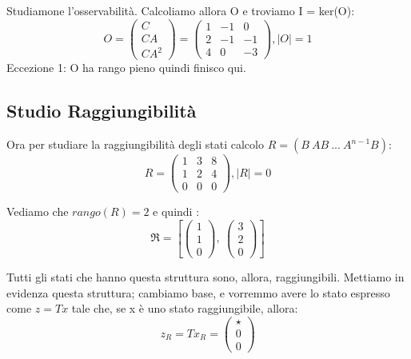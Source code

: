 \documentclass{article}
\begin{document}
Studiamone l’osservabilità. Calcoliamo allora O e troviamo I = ker(O):
\[
 O = \begin{pmatrix}C \\ CA \\ CA^2 \end{pmatrix} = \left(\begin{matrix}1 & -1 & 0\\2 & -1 & -1\\4 & 0 & -3\end{matrix}\right), |O| = 1 \]
Eccezione 1: O ha rango pieno quindi finisco qui.

\subsection{Studio Raggiungibilità}
Ora per studiare la raggiungibilità degli stati calcolo $R = (B\ AB\ ...\ A^{n-1}B)$: \[ R = \left(\begin{matrix}1 & 3 & 8\\1 & 2 & 4\\0 & 0 & 0\end{matrix}\right), |R| = 0 \] 

Vediamo che $rango(R) = 2$ e quindi : \[ \mathfrak{R} = \left[ \left(\begin{matrix}1\\1\\0\end{matrix}\right), \  \left(\begin{matrix}3\\2\\0\end{matrix}\right)\right] \]

Tutti gli stati che hanno questa struttura sono, allora, raggiungibili. Mettiamo in evidenza questa struttura;
cambiamo base, e vorremmo avere lo stato espresso come $z = Tx$ tale che, se x è uno stato raggiungibile, allora: \[ z_R = T x_R = \begin{pmatrix} \star  \\ 0 \\0\end{pmatrix}\]
\end{document}
